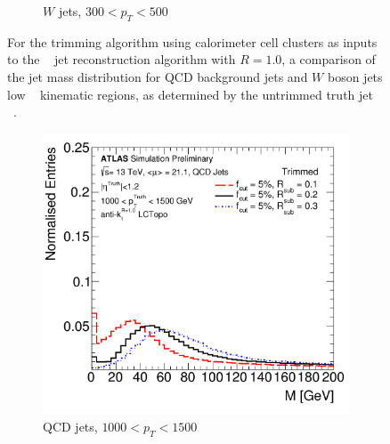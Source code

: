 \begin{figure}[htbp!]
\begin{subfigure}[b]{0.4\textwidth}
        \caption{$W$ jets, $300 < p_{T} < 500$ \GeV}
        \label{fig:obj_trim_w_lowpt}
    \end{subfigure} 
   \caption{
   For the trimming algorithm using calorimeter cell clusters as inputs to the \akt~ jet reconstruction algorithm with $R = 1.0$, a comparison of the jet mass distribution for QCD background jets and $W$ boson jets low \pt~ kinematic regions, as determined by the untrimmed truth jet \pt~.}
  \label{fig:obj_trim-lowpt}
\end{figure}


\begin{figure}[htbp!]
  \centering
  \captionsetup{justification=centering}
    \begin{subfigure}[b]{0.4\textwidth}
        \includegraphics[width=\textwidth]{figures/object/trim_qcd_highpt}
        \caption{QCD jets, $1000 < p_{T} < 1500$ \GeV}
        \label{fig:obj_trim_qcd_highpt}
    \end{subfigure}
    \quad \quad 
    \begin{subfigure}[b]{0.4\textwidth}

\end{subfigure}
\end{figure}
